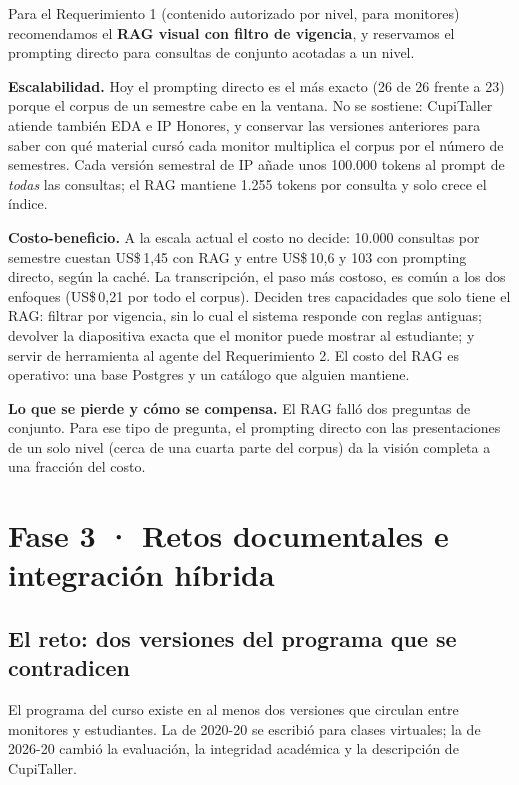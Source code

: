\documentclass[11pt,letterpaper]{article}
\begin{document}
Para el Requerimiento 1 (contenido autorizado por nivel, para monitores) recomendamos el \textbf{RAG visual con filtro de vigencia}, y reservamos el prompting directo para consultas de conjunto acotadas a un nivel.

\textbf{Escalabilidad.} Hoy el prompting directo es el más exacto (26 de 26 frente a 23) porque el corpus de un semestre cabe en la ventana. No se sostiene: CupiTaller atiende también EDA e IP Honores, y conservar las versiones anteriores para saber con qué material cursó cada monitor multiplica el corpus por el número de semestres. Cada versión semestral de IP añade unos 100.000 tokens al prompt de \emph{todas} las consultas; el RAG mantiene 1.255 tokens por consulta y solo crece el índice.

\textbf{Costo-beneficio.} A la escala actual el costo no decide: 10.000 consultas por semestre cuestan US\$\,1,45 con RAG y entre US\$\,10,6 y 103 con prompting directo, según la caché. La transcripción, el paso más costoso, es común a los dos enfoques (US\$\,0,21 por todo el corpus). Deciden tres capacidades que solo tiene el RAG: filtrar por vigencia, sin lo cual el sistema responde con reglas antiguas; devolver la diapositiva exacta que el monitor puede mostrar al estudiante; y servir de herramienta al agente del Requerimiento 2. El costo del RAG es operativo: una base Postgres y un catálogo que alguien mantiene.

\textbf{Lo que se pierde y cómo se compensa.} El RAG falló dos preguntas de conjunto. Para ese tipo de pregunta, el prompting directo con las presentaciones de un solo nivel (cerca de una cuarta parte del corpus) da la visión completa a una fracción del costo.

\section{Fase 3 · Retos documentales e integración híbrida}

\subsection{El reto: dos versiones del programa que se contradicen}

El programa del curso existe en al menos dos versiones que circulan entre monitores y estudiantes. La de 2020-20 se escribió para clases virtuales; la de 2026-20 cambió la evaluación, la integridad académica y la descripción de CupiTaller.
\end{document}
